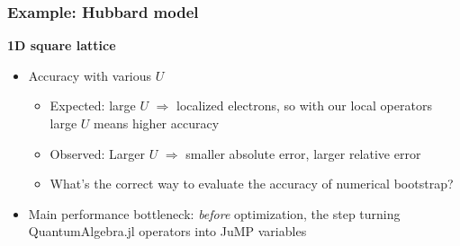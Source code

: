 \documentclass{beamer}
\begin{document}
\begin{frame}
\frametitle{Example: Hubbard model}

\textbf{1D square lattice}

\begin{itemize}
    \item Accuracy with various $U$
    \begin{itemize}
        \item Expected: large $U$ $\Rightarrow$ localized electrons, so with our local operators large $U$ means higher accuracy
        \item Observed: Larger $U$ $\Rightarrow$ smaller absolute error, larger relative error 
        \item What's the correct way to evaluate the accuracy of numerical bootstrap?
    \end{itemize}
    \item Main performance bottleneck: \emph{before} optimization, the step turning QuantumAlgebra.jl operators
    into JuMP variables
\end{itemize}

\end{frame}
\end{document}
